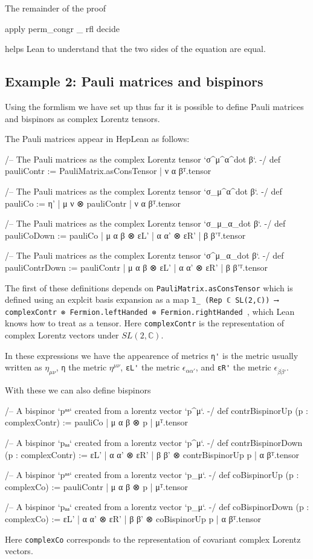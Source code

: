 \documentclass[a4paper, 11pt]{article}
\begin{document}
The remainder of the proof
\begin{code}
  apply perm_congr _ rfl
  decide
\end{code}
helps Lean to understand that the two sides of the equation are equal.
\subsection{Example 2: Pauli matrices and bispinors} \label{sec:examplePauliBispinor}
Using the formlism we have set up thus far it is possible to define Pauli matrices and bispinors 
as complex Lorentz tensors.
 
The Pauli matrices appear in HepLean as follows:
\begin{code}
/-- The Pauli matrices as the complex Lorentz tensor `σ^μ^α^{dot β}`. -/
def pauliContr := {PauliMatrix.asConsTensor | ν α β}ᵀ.tensor

/-- The Pauli matrices as the complex Lorentz tensor `σ_μ^α^{dot β}`. -/
def pauliCo := {η' | μ ν ⊗ pauliContr | ν α β}ᵀ.tensor

/-- The Pauli matrices as the complex Lorentz tensor `σ_μ_α_{dot β}`. -/
def pauliCoDown := {pauliCo | μ α β ⊗ εL' | α α' ⊗ εR' | β β'}ᵀ.tensor

/-- The Pauli matrices as the complex Lorentz tensor `σ^μ_α_{dot β}`. -/
def pauliContrDown := {pauliContr | μ α β ⊗ εL' | α α' ⊗ εR' | β β'}ᵀ.tensor
\end{code}
The first of these definitions depends on \lstinline|PauliMatrix.asConsTensor| which is defined 
using an explcit basis expansion as a map \lstinline|𝟙_ (Rep ℂ SL(2,ℂ)) ⟶ complexContr ⊗ Fermion.leftHanded ⊗ Fermion.rightHanded |, which Lean 
knows how to treat as a tensor. Here \lstinline|complexContr| is the representation of complex Lorentz vectors 
under $SL(2, \mathbb{C})$.

In these expressions we have the appearence of metrics \lstinline|η'| is the metric usually written as 
$\eta_{\mu \nu}$, \lstinline|η| the metric $\eta^{\mu \nu}$, \lstinline|εL'| the  metric 
$\epsilon_{\alpha \alpha'}$, and \lstinline|εR'| the metric $\epsilon_{\dot \beta \dot \beta'}$.

With these we can also define bispinors 
\begin{code}
/-- A bispinor `pᵃᵃ` created from a lorentz vector `p^μ`. -/
def contrBispinorUp (p : complexContr) :=
  {pauliCo | μ α β ⊗ p | μ}ᵀ.tensor

/-- A bispinor `pₐₐ` created from a lorentz vector `p^μ`. -/
def contrBispinorDown (p : complexContr) :=
  {εL' | α α' ⊗ εR' | β β' ⊗ contrBispinorUp p | α β}ᵀ.tensor

/-- A bispinor `pᵃᵃ` created from a lorentz vector `p_μ`. -/
def coBispinorUp (p : complexCo) := {pauliContr | μ α β ⊗ p | μ}ᵀ.tensor

/-- A bispinor `pₐₐ` created from a lorentz vector `p_μ`. -/
def coBispinorDown (p : complexCo) :=
  {εL' | α α' ⊗ εR' | β β' ⊗ coBispinorUp p | α β}ᵀ.tensor
\end{code}
Here  \lstinline|complexCo| corresponds to the representation of covariant complex Lorentz vectors.
\end{document}
